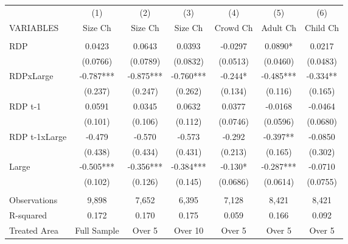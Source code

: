 \begin{tabular}{lcccccc} \hline
 & (1) & (2) & (3) & (4) & (5) & (6) \\
VARIABLES & Size Ch & Size Ch & Size Ch & Crowd Ch & Adult Ch & Child Ch \\ \hline
 &  &  &  &  &  &  \\
RDP & 0.0423 & 0.0643 & 0.0393 & -0.0297 & 0.0890* & 0.0217 \\
 & (0.0766) & (0.0789) & (0.0832) & (0.0513) & (0.0460) & (0.0483) \\
RDPxLarge & -0.787*** & -0.875*** & -0.760*** & -0.244* & -0.485*** & -0.334** \\
 & (0.237) & (0.247) & (0.262) & (0.134) & (0.116) & (0.165) \\
RDP t-1 & 0.0591 & 0.0345 & 0.0632 & 0.0377 & -0.0168 & -0.0464 \\
 & (0.101) & (0.106) & (0.112) & (0.0746) & (0.0596) & (0.0680) \\
RDP t-1xLarge & -0.479 & -0.570 & -0.573 & -0.292 & -0.397** & -0.0850 \\
 & (0.438) & (0.434) & (0.431) & (0.213) & (0.165) & (0.302) \\
Large & -0.505*** & -0.356*** & -0.384*** & -0.130* & -0.287*** & -0.0710 \\
 & (0.102) & (0.126) & (0.145) & (0.0686) & (0.0614) & (0.0755) \\
 &  &  &  &  &  &  \\
Observations & 9,898 & 7,652 & 6,395 & 7,128 & 8,421 & 8,421 \\
R-squared & 0.172 & 0.170 & 0.175 & 0.059 & 0.166 & 0.092 \\
 Treated Area & Full Sample & Over 5 & Over 10 & Over 5 & Over 5 & Over 5 \\ \hline
\end{tabular}
